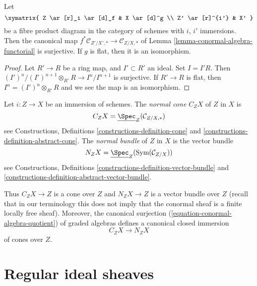 \begin{lemma}
\label{lemma-conormal-algebra-functorial-flat}
Let
$$
\xymatrix{
Z \ar[r]_i \ar[d]_f & X \ar[d]^g \\
Z' \ar[r]^{i'} & X'
}
$$
be a fibre product diagram in the category of schemes with
$i$, $i'$ immersions. Then the canonical map
$f^*\mathcal{C}_{Z'/X', *} \to \mathcal{C}_{Z/X, *}$ of
Lemma \ref{lemma-conormal-algebra-functorial}
is surjective. If $g$ is flat, then it is an isomorphism.
\end{lemma}

\begin{proof}
Let $R' \to R$ be a ring map, and $I' \subset R'$ an ideal.
Set $I = I'R$. Then $(I')^n/(I')^{n + 1} \otimes_{R'} R \to I^n/I^{n + 1}$
is surjective. If $R' \to R$ is flat, then $I^n = (I')^n \otimes_{R'} R$
and we see the map is an isomorphism.
\end{proof}

\begin{definition}
\label{definition-normal-cone}
Let $i : Z \to X$ be an immersion of schemes.
The {\it normal cone $C_ZX$} of $Z$ in $X$ is
$$
C_ZX = \underline{\Spec}_Z(\mathcal{C}_{Z/X, *})
$$
see
Constructions,
Definitions \ref{constructions-definition-cone} and
\ref{constructions-definition-abstract-cone}. The {\it normal bundle}
of $Z$ in $X$ is the vector bundle
$$
N_ZX = \underline{\Spec}_Z(\text{Sym}(\mathcal{C}_{Z/X}))
$$
see
Constructions,
Definitions \ref{constructions-definition-vector-bundle} and
\ref{constructions-definition-abstract-vector-bundle}.
\end{definition}

\noindent
Thus $C_ZX \to Z$ is a cone over $Z$ and $N_ZX \to Z$ is a vector bundle
over $Z$ (recall that in our terminology this does not imply that
the conormal sheaf is a finite locally free sheaf). Moreover, the canonical
surjection (\ref{equation-conormal-algebra-quotient}) of graded algebras
defines a canonical closed immersion
\begin{equation}
\label{equation-normal-cone-in-normal-bundle}
C_ZX \longrightarrow N_ZX
\end{equation}
of cones over $Z$.





\section{Regular ideal sheaves}
\label{section-regular-ideal-sheaves}

